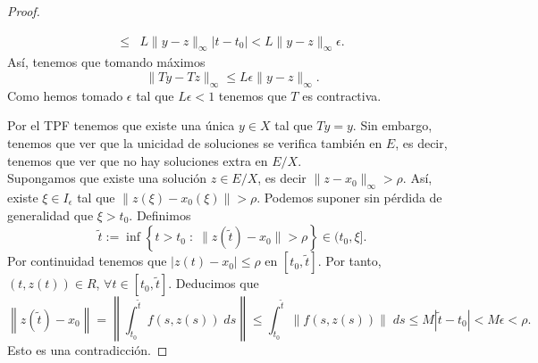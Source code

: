 \begin{proof}
\begin{itemize}
\[\begin{split}
		\leq & L \|y-z\|_{\infty } \left|t-t_{0}\right| < L \|y-z\|_{\infty }\epsilon .
	\end{split}
	\]
Así, tenemos que tomando máximos
\[\|Ty-Tz\|_{\infty }\leq L\epsilon \|y-z\|_{\infty } .\]
Como hemos tomado $\displaystyle \epsilon  $ tal que $\displaystyle L\epsilon < 1 $ tenemos que $\displaystyle T $ es contractiva. 
\end{itemize}
Por el TPF tenemos que existe una única $\displaystyle y \in X $ tal que $\displaystyle Ty = y $. Sin embargo, tenemos que ver que la unicidad de soluciones se verifica también en $\displaystyle E $, es decir, tenemos que ver que no hay soluciones extra en $\displaystyle E/X $. \\

Supongamos que existe una solución $\displaystyle z \in E/X $, es decir $\displaystyle \|z-x_{0}\|_{\infty} > \rho $. Así, existe $\displaystyle \xi \in I_{\epsilon } $ tal que $\displaystyle \left\|z\left(\xi\right)-x_{0}\left(\xi\right)\right\|>\rho $. Podemos suponer sin pérdida de generalidad que $\displaystyle \xi > t_{0} $. Definimos
\[\tilde{t} := \inf \left\{ t > t_{0} \; : \; \|z\left(\tilde{t}\right)-x_{0}\| > \rho\right\}\in (t_{0}, \xi]  .\]
Por continuidad tenemos que $\displaystyle \left|z\left(t\right)-x_{0}\right| \leq \rho $ en $\displaystyle \left[t_{0}, \tilde{t}\right]  $. Por tanto, $\displaystyle \left(t, z\left(t\right)\right)\in R $, $\displaystyle \forall t \in \left[t_{0}, \tilde{t}\right]  $. Deducimos que
\[
	\left\|z\left(\tilde{t}\right)-x_{0}\right\| =  \left\|\int^{\tilde{t}}_{t_{0}} f\left(s, z\left(s\right)\right) \; d s\right\| \leq \int^{\tilde{t}}_{t_{0}} \left\|f\left(s, z\left(s\right)\right)\right\| \; d s \leq M \left|\tilde{t}-t_{0}\right| < M\epsilon < \rho.
\]
Esto es una contradicción. 
\end{proof}
